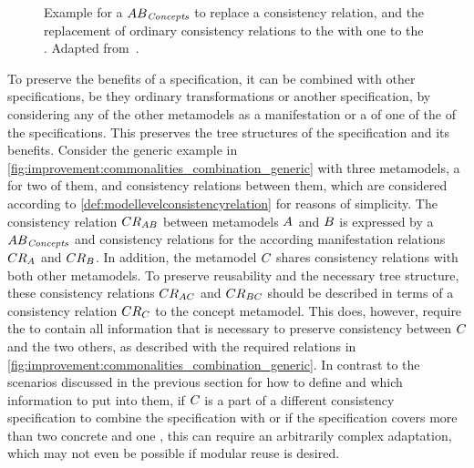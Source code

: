 \begin{figure}
    \centering
    
    \caption[Partial transformation network of \commonalities]{Example for a \conceptmetamodel $\metamodel{AB}{\mathvariable{Concepts}}$ to replace a consistency relation, and the replacement of ordinary consistency relations to the \concretemetamodels with one to the \conceptmetamodel. Adapted from~.}
    \label{fig:improvement:commonalities_combination_generic}
\end{figure}

To preserve the benefits of a \commonalities specification, it can be combined with other specifications, be they ordinary transformations or another \commonalities specification, by considering any of the other metamodels as a manifestation or a \conceptmetamodel of one of the \conceptmetamodels of the \commonalities specifications.
This preserves the tree structures of the \commonalities specification and its benefits.
Consider the generic example in \autoref{fig:improvement:commonalities_combination_generic} with three metamodels, a \conceptmetamodel for two of them, and consistency relations between them, which are considered \modellevelconsistencyrelations according to \autoref{def:modellevelconsistencyrelation} for reasons of simplicity.
The consistency relation $\consistencyrelation{CR}{AB}$ between metamodels $\metamodel{A}{}$ and $\metamodel{B}{}$ is expressed by a \conceptmetamodel $\metamodel{AB}{\mathvariable{Concepts}}$ and consistency relations for the according manifestation relations $\consistencyrelation{CR}{A}$ and $\consistencyrelation{CR}{B}$.
In addition, the metamodel $\metamodel{C}{}$ shares consistency relations with both other metamodels.
To preserve reusability and the necessary tree structure, these consistency relations $\consistencyrelation{CR}{AC}$ and $\consistencyrelation{CR}{BC}$ should be described in terms of a consistency relation $\consistencyrelation{CR}{C}$ to the concept metamodel.
This does, however, require the \conceptmetamodel to contain all information that is necessary to preserve consistency between $\metamodel{C}{}$ and the two others, as described with the required relations in \autoref{fig:improvement:commonalities_combination_generic}.
In contrast to the scenarios discussed in the previous section for how to define \conceptmetamodels and which information to put into them, if $\metamodel{C}{}$ is a part of a different consistency specification to combine the \commonalities specification with or if the \commonalities specification covers more than two concrete and one \conceptmetamodel, this can require an arbitrarily complex adaptation, which may not even be possible if modular reuse is desired.

